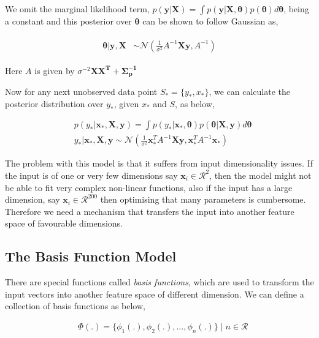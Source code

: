 \documentclass[english]{tktltiki}
\begin{document}
We omit the marginal likelihood term, $p(\mathbf{y} | \mathbf{X}) = \int p(\mathbf{y} | \mathbf{X}, \boldsymbol \theta)p(\boldsymbol \theta)d\boldsymbol \theta$, being a constant and this posterior over $\boldsymbol \theta$ can be shown to follow Gaussian as,

\begin{eqnarray}
\begin{split}
\boldsymbol \theta | \mathbf{y}, \mathbf{X} & \sim \mathcal{N}(\frac{1}{\sigma^2} A^{-1} \mathbf{Xy}, A^{-1})
\end{split}
\end{eqnarray}

Here $A$ is given by $\sigma^{-2} \mathbf{XX^T + \Sigma_p^{-1}}$

Now for any next unobserved data point $S_* = \{y_*, x_*\}$, we can calculate the posterior distribution over $y_*$, given $x_*$ and $S$, as below,

\begin{equation}
\label{conti_rnd_var_bayes_poster}
\begin{split}
	&p(y_* | \mathbf{x}_*, \mathbf{X}, \mathbf{y}) = \int p(y_* | \mathbf{x}_*, \boldsymbol\theta)p(\boldsymbol\theta | \mathbf{X}, \mathbf{y})d \boldsymbol\theta \\
	&y_* | \mathbf{x}_*, \mathbf{X}, \mathbf{y} \sim \mathcal{N}(\frac{1}{\sigma^2}\mathbf{x}_*^T A^{-1} \mathbf{Xy}, \mathbf{x}_*^T A^{-1} \mathbf{x}_*)
\end{split}
\end{equation}

The problem with this model is that it suffers from input dimensionality issues. If the input is of one or very few dimensions say $\mathbf{x}_i \in \mathcal{R}^2$, then the model might not be able to fit very complex non-linear functions, also if the input has a large dimension, say $\mathbf{x}_i \in \mathcal{R}^{200}$ then optimising that many parameters is cumbersome. Therefore we need a mechanism that transfers the input into another feature space of favourable dimensions.


\subsection{The Basis Function Model}
There are special functions called \textit{basis functions}, which are used to transform the input vectors into another feature space of different dimension. We can define a collection of basis functions as below,

\begin{equation}
\label{eqn:basis_function}
\begin{split}
	&\Phi(.) = \{\phi_1(.), \phi_2(.), ...,\phi_n(.)\} \mid n \in \mathcal{R}
\end{split}
\end{equation}
\end{document}
